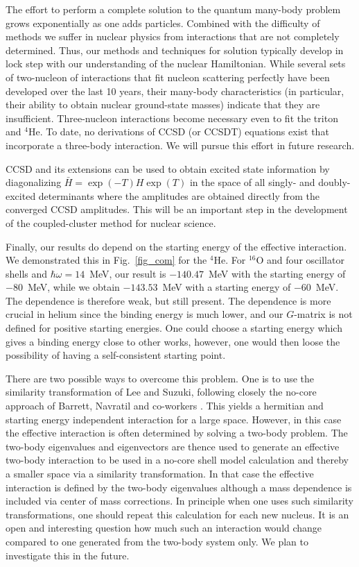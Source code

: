 The effort to perform a complete solution to 
the quantum many-body problem grows exponentially 
as one adds particles. Combined with the difficulty
of methods we suffer in nuclear physics from interactions that
are not completely determined. Thus, our methods and techniques
for solution typically develop in lock step with our understanding of
the nuclear Hamiltonian. While several sets of two-nucleon 
of interactions that fit nucleon scattering perfectly have been 
developed over the last 10 years, their many-body characteristics
(in particular, their ability to obtain nuclear ground-state masses) 
indicate that they are insufficient. Three-nucleon interactions become
necessary even to fit the triton and $^{4}$He. To date, no derivations of
CCSD (or CCSDT) equations exist that incorporate a three-body interaction. 
We will pursue this effort in future research. 

CCSD and its extensions can be used to obtain excited state information
by diagonalizing $\bar{H}=\exp\left(-T\right)H\exp\left(T\right)$ in
the space of all singly- and doubly-excited determinants where 
the amplitudes are obtained directly from the converged CCSD
amplitudes.  This will be an important step in the development of 
the coupled-cluster method for nuclear science. 

Finally, our results do depend on the starting energy 
of the effective interaction. We demonstrated this in Fig.~\ref{fig_com}
for the $^{4}$He.  For $^{16}$O and four oscillator shells and 
$\hbar\omega=14$~MeV, our result is 
$-140.47$~MeV with the starting energy of $-80$~MeV, while
we obtain $-143.53$~MeV with a starting energy of $-60$~MeV. 
The dependence is therefore weak, but still 
present.  The dependence is more crucial in helium since the binding
energy is much lower, and our $G$-matrix is not defined for positive
starting energies.  One could choose a starting energy 
which gives a binding energy close to other works, however, one would 
then loose the possibility of having a self-consistent starting point.

There are two possible ways to 
overcome this problem. One is to use the similarity transformation
of Lee and Suzuki, following closely the no-core approach of Barrett, 
Navratil and co-workers \cite{bruce1,bruce2,bruce3}.
This yields a hermitian and starting energy independent interaction 
for a large space. However, in this case
the effective interaction
 is often determined by solving a two-body problem. The two-body
 eigenvalues and eigenvectors are thence used to generate an effective
 two-body interaction to be used in a no-core shell model calculation
 and thereby a smaller space via a similarity transformation. 
In that case the effective interaction is defined by the
 two-body eigenvalues although a mass dependence is included via 
center of mass corrections. 
In principle when one uses such similarity transformations, one should
repeat this calculation for each new nucleus. 
It is an open and interesting question how 
much such an interaction would change compared to one generated from the
two-body system only.
We plan to investigate this in the future.

